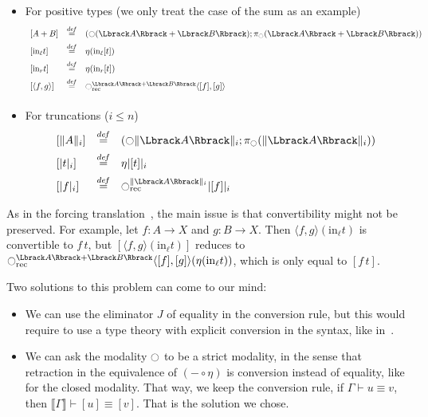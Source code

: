 \begin{itemize}
\item For positive types (we only treat the case of the sum as an example)
\[
\begin{array}{lcl}
\left[  A+B \right] &\defeq& \left( \modal(\Lbrack A \Rbrack + \Lbrack B
                        \Rbrack); \pi_\modal(\Lbrack A \Rbrack + \Lbrack B
                        \Rbrack)\right)\\[0.5em]
\left[  \mathrm{in}_\ell t \right] &\defeq& \eta (\mathrm{in}_\ell [t]) \\[0.5em]
\left[  \mathrm{in}_r t \right] &\defeq& \eta (\mathrm{in}_r [t]) \\[0.5em]
\left[ \langle f ,g\rangle\right] &\defeq& \modal_{\mathrm{rec}}^{\Lbrack A\Rbrack +
                                      \Lbrack B\Rbrack} \langle
                                      [f],[g]\rangle\\[0.5em]
\end{array}
\]
\item For truncations ($i\leqslant n$)
\[
\begin{array}{lcl}
  \left[  \|A\|_i \right] &\defeq& (\modal \| \Lbrack A\Rbrack  \|_i;
                                   \pi_\modal(\| \Lbrack A\Rbrack
                                   \|_i)) \\[0.5em]
  \left[ |t|_i \right] &\defeq& \eta |[t]|_i \\[0.5em]
  \left[ |f|_i \right] &\defeq& \modal_{\mathrm{rec}}^{\| \Lbrack
                                  A\Rbrack  \|_i} | [f] |_i
\end{array}
\]

\end{itemize}

As in the forcing translation~\cite{jaber2012extending}, the main
issue is that convertibility might not be preserved. For
example, let $f:A \to X$ and $g:B\to X$. Then $\langle f,g\rangle
(\mathrm{in}_\ell t)$ is convertible to $f\,t$, but $[\langle f,g\rangle
(\mathrm{in}_\ell t)]$ reduces to $\modal_{\mathrm{rec}}^{\Lbrack A\Rbrack +
                                      \Lbrack
                                      B\Rbrack}\langle[f],[g]\rangle(\eta(\mathrm{in}_\ell
                                    t))$, which is only equal to $[f\,t]$.


Two solutions to this problem can come to our mind:
\begin{itemize}
\item We can use the eliminator $J$ of equality in the conversion
  rule, but this would require to use a type theory with explicit
  conversion in the syntax, like in~\cite{jaber2012extending}.
\item We can ask the modality $\ocircle$ to be a strict modality, in the
  sense that retraction in the equivalence of $(-\circ\eta)$ is conversion
  instead of equality, like for the closed modality. 
  That way, we keep the conversion rule, \ie{} if $\Gamma \vdash
  u \equiv v$, then $\Lbrack \Gamma \Rbrack \vdash [u] \equiv [v]$.
  That is the solution we chose.
\end{itemize}

